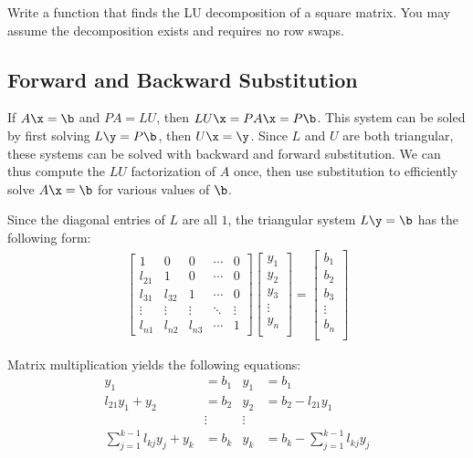 \begin{problem}
Write a function that finds the LU decomposition of a square matrix.
You may assume the decomposition exists and requires no row swaps.
\label{prob:LU-Decomposition}
\end{problem}

\subsection*{Forward and Backward Substitution} %

If $A\x = \b$ and $PA = LU$, then $LU\x = PA\x = P\b$.
This system can be soled by first solving $L\y = P\b$, then $U\x = \y$.
Since $L$ and $U$ are both triangular, these systems can be solved with backward and forward substitution.
We can thus compute the $LU$ factorization of $A$ once, then use substitution to efficiently solve $A\x=\b$ for various values of $\b$.

Since the diagonal entries of $L$ are all $1$, the triangular system $L\y = \b$ has the following form:
%
\begin{align*}
\left[\begin{array}{ccccc}
1      & 0      & 0      & \cdots & 0 \\
l_{21} & 1      & 0      & \cdots & 0 \\
l_{31} & l_{32} & 1      & \cdots & 0 \\
\vdots & \vdots & \vdots & \ddots & \vdots \\
l_{n1} & l_{n2} & l_{n3} & \cdots & 1
\end{array}\right]
\left[\begin{array}{c}
y_1 \\ y_2 \\ y_3 \\ \vdots \\ y_n \\
\end{array}\right]
=
\left[\begin{array}{c}
b_1 \\ b_2 \\ b_3 \\ \vdots \\ b_n \\
\end{array}\right]
\end{align*}

Matrix multiplication yields the following equations:
%
\begin{align}
\nonumber y_1 &= b_1 & y_1 &= b_1 \\
\nonumber l_{21}y_1 + y_2 &= b_2 & y_2 &= b_2 - l_{21}y_1 \\
\nonumber & \vdots & \vdots & \\
\sum_{j=1}^{k-1}l_{kj}y_j + y_k &= b_k & y_k &= b_k - \sum_{j=1}^{k-1}l_{kj}y_j
\label{eq:forward-substitution}
\end{align}

